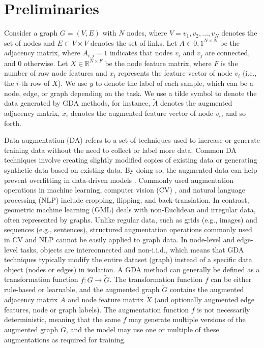 \documentclass[acmsmall,natbib=false]{acmart}
\begin{document}
\section{Preliminaries}
Consider a graph $G = (V, E)$ with $N$ nodes, where $V = {v_1, v_2, \ldots, v_N}$ denotes the set of nodes and $E \subset V \times V$ denotes the set of links. Let $A \in {0,1}^{N \times N}$ be the adjacency matrix, where $A_{i,j} = 1$ indicates that nodes $v_i$ and $v_j$ are connected, and $0$ otherwise. Let $X \in \mathbb{R}^{N \times F}$ be the node feature matrix, where $F$ is the number of raw node features and $x_i$ represents the feature vector of node $v_i$ (i.e., the $i$-th row of $X$). We use $y$ to denote the label of each sample, which can be a node, edge, or graph depending on the task. We use a tilde symbol to denote the data generated by GDA methods, for instance, $\tilde{A}$ denotes the augmented adjacency matrix, $\tilde{x}_i$ denotes the augmented feature vector of node $v_i$, and so forth.

Data augmentation (DA) refers to a set of techniques used to increase or generate training data without the need to collect or label more data. Common DA techniques involve creating slightly modified copies of existing data or generating synthetic data based on existing data. By doing so, the augmented data can help prevent overfitting in data-driven models \cite{85}. Commonly used augmentation operations in machine learning, computer vision (CV) \cite{15}, and natural language processing (NLP) \cite{26} include cropping, flipping, and back-translation. In contrast, geometric machine learning (GML) deals with non-Euclidean and irregular data, often represented by graphs. Unlike regular data, such as grids (e.g., images) and sequences (e.g., sentences), structured augmentation operations commonly used in CV and NLP cannot be easily applied to graph data. In node-level and edge-level tasks, objects are interconnected and non-i.i.d., which means that GDA techniques typically modify the entire dataset (graph) instead of a specific data object (nodes or edges) in isolation. A GDA method can generally be defined as a transformation function $f: G \rightarrow \tilde{G}$. The transformation function $f$ can be either rule-based or learnable, and the augmented graph $\tilde{G}$ contains the augmented adjacency matrix $\tilde{A}$ and node feature matrix $\tilde{X}$ (and optionally augmented edge features, node or graph labels). The augmentation function $f$ is not necessarily deterministic, meaning that the same $f$ may generate multiple versions of the augmented graph $\tilde{G}$, and the model may use one or multiple of these augmentations as required for training.
\end{document}

